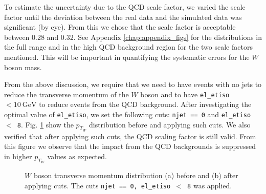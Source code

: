 \documentclass[a4paper]{report}
\numberwithin{equation}{section}
\begin{document}
To estimate the uncertainty due to the QCD scale factor, we varied the scale factor until the deviation between the real data 
and the simulated data was significant (by eye). From this we chose that the scale factor is acceptable between 0.28 and 
0.32. See Appendix \ref{chap:appendix_figs} for the distributions in the full range 
and in the high QCD background region for the two scale factors mentioned. This will be important in quantifying the systematic 
errors for the $W$ boson mass. \par 

From the above discussion, we require that we need to have events with no jets to reduce the transverse momentum of the $W$ boson and 
to have \texttt{el\_etiso} $< \SI{10}{\giga\electronvolt}$ to reduce events from the QCD background. After investigating the optimal 
value of \texttt{el\_etiso}, we set the following cuts: \texttt{njet == 0} and \texttt{el\_etiso $<$ 8}. Fig. \ref{fig:ptw_cuts} show 
the $p_{T_W}$ distribution before and applying such cuts. We also verified that after applying 
such cuts, the QCD scaling factor is still valid. From this figure we observe that the impact from the QCD backgrounds 
is suppressed in higher $p_{T_W}$ values as expected. 

\begin{figure}[htb!]
	\centering
	\quad
	\centering
	\caption{$W$ boson transverse momentum distribution (a) before and (b) after applying cuts. The cuts \texttt{njet == 0, el\_etiso $<$ 8}
    was applied.}
	\label{fig:ptw_cuts}
\end{figure}
\end{document}
